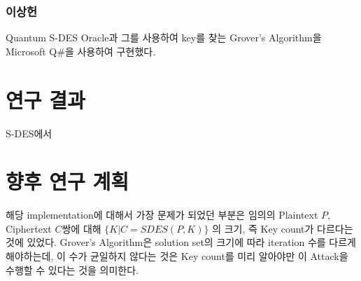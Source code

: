 \documentclass{article}
\theoremstyle{break}
\begin{document}
	\subsubsection{이상헌}
	
	Quantum S-DES Oracle과 그를 사용하여 key를 찾는 Grover's Algorithm을 Microsoft Q\#을 사용하여 구현했다.
	
	\section{연구 결과}
	
	S-DES에서 
	
	\section{향후 연구 계획}
	
	해당 implementation에 대해서 가장 문제가 되었던 부분은 임의의 Plaintext $P$, Ciphertext $C$쌍에 대해 $\{K|C=SDES(P,K)\}$ 의 크기, 즉 Key count가 다르다는 것에 있었다. Grover's Algorithm은 solution set의 크기에 따라 iteration 수를 다르게 해야하는데, 이 수가 균일하지 않다는 것은 Key count를 미리 알아야만 이 Attack을 수행할 수 있다는 것을 의미한다.
	
\end{document}
